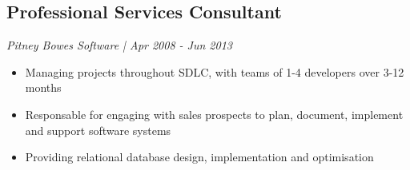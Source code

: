 %
%
\subsection{Professional Services Consultant}
\textit{Pitney Bowes Software | Apr 2008 - Jun 2013}
\begin{itemize}
	\item Managing projects throughout SDLC, with teams of 1-4 developers over 3-12 months
	\item Responsable for engaging with sales prospects to plan, document, implement and support software systems
	\item Providing relational database design, implementation and optimisation
\end{itemize}
